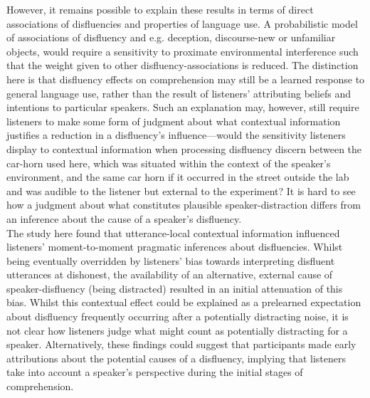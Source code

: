 \documentclass[a4paper,man,natbib]{apa6}
\begin{document}
However, it remains possible to explain these results in terms of direct associations of disfluencies and properties of language use. 
A probabilistic model of associations of disfluency and e.g. deception, discourse-new or unfamiliar objects, would require a sensitivity to proximate environmental interference such that the weight given to other disfluency-associations is reduced. 
The distinction here is that disfluency effects on comprehension may still be a learned response to general language use, rather than the result of listeners' attributing beliefs and intentions to particular speakers. 
Such an explanation may, however, still require listeners to make some form of judgment about what contextual information justifies a reduction in a disfluency's influence---would the sensitivity listeners display to contextual information when processing disfluency discern between the car-horn used here, which was situated within the context of the speaker's environment, and the same car horn if it occurred in the street outside the lab and was audible to the listener but external to the experiment? 
It is hard to see how a judgment about what constitutes plausible speaker-distraction differs from an inference about the cause of a speaker's disfluency.\\

The study here found that utterance-local contextual information influenced listeners' moment-to-moment pragmatic inferences about disfluencies. 
Whilst being eventually overridden by listeners' bias towards interpreting disfluent utterances at dishonest, the availability of an alternative, external cause of speaker-disfluency (being distracted) resulted in an initial attenuation of this bias. 
Whilst this contextual effect could be explained as a prelearned expectation about disfluency frequently occurring after a potentially distracting noise, it is not clear how listeners judge what might count as potentially distracting for a speaker.
Alternatively, these findings could suggest that participants made early attributions about the potential causes of a disfluency, implying that listeners take into account a speaker's perspective during the initial stages of comprehension. 
\end{document}
